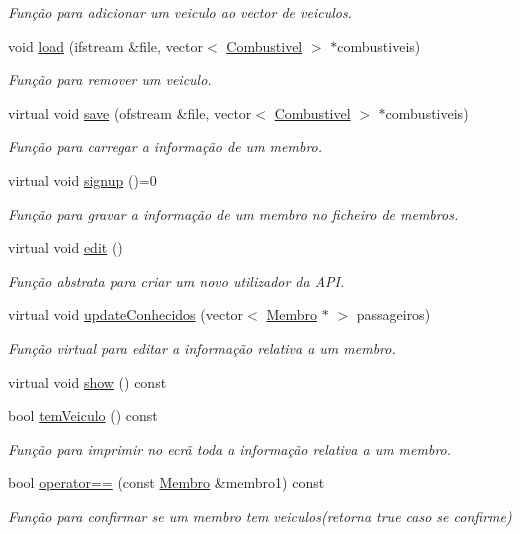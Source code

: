 \begin{DoxyCompactItemize}
\begin{DoxyCompactList}\small\item\em Função para adicionar um veiculo ao vector de veiculos. \end{DoxyCompactList}\item 
void \hyperlink{class_membro_a3f6fcbde8bb6e631101e838e07240126}{load} (ifstream \&file, vector$<$ \hyperlink{class_combustivel}{Combustivel} $>$ $\ast$combustiveis)
\begin{DoxyCompactList}\small\item\em Função para remover um veiculo. \end{DoxyCompactList}\item 
virtual void \hyperlink{class_membro_a2a8ceaddac1fb7b0f894b1adc9315f03}{save} (ofstream \&file, vector$<$ \hyperlink{class_combustivel}{Combustivel} $>$ $\ast$combustiveis)
\begin{DoxyCompactList}\small\item\em Função para carregar a informação de um membro. \end{DoxyCompactList}\item 
virtual void \hyperlink{class_membro_ab88b510a234c18aa035c28f4253140b3}{signup} ()=0
\begin{DoxyCompactList}\small\item\em Função para gravar a informação de um membro no ficheiro de membros. \end{DoxyCompactList}\item 
virtual void \hyperlink{class_membro_a0e4aef4dc61b9f22b277591249714452}{edit} ()
\begin{DoxyCompactList}\small\item\em Função abstrata para criar um novo utilizador da A\+P\+I. \end{DoxyCompactList}\item 
virtual void \hyperlink{class_membro_a67dab9bc0fd069a6e3204044005c197f}{update\+Conhecidos} (vector$<$ \hyperlink{class_membro}{Membro} $\ast$ $>$ passageiros)
\begin{DoxyCompactList}\small\item\em Função virtual para editar a informação relativa a um membro. \end{DoxyCompactList}\item 
virtual void \hyperlink{class_membro_a9931c13a2894a9a62760a5dddb867997}{show} () const 
\item 
bool \hyperlink{class_membro_a2d507bc34837f55b91510a86d507d8bc}{tem\+Veiculo} () const 
\begin{DoxyCompactList}\small\item\em Função para imprimir no ecrã toda a informação relativa a um membro. \end{DoxyCompactList}\item 
bool \hyperlink{class_membro_a1561028d847eead98b720c339557262c}{operator==} (const \hyperlink{class_membro}{Membro} \&membro1) const 
\begin{DoxyCompactList}\small\item\em Função para confirmar se um membro tem veiculos(retorna true caso se confirme) \end{DoxyCompactList}\end{DoxyCompactItemize}
